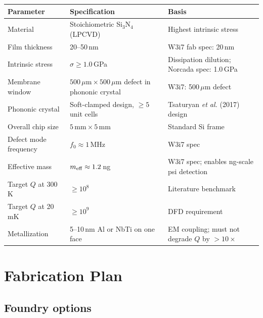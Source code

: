 \documentclass[11pt]{article}
\begin{document}
\begin{center}
\renewcommand{\arraystretch}{1.25}
\begin{tabular}{@{}p{5cm}p{4cm}p{4cm}@{}}
\toprule
\textbf{Parameter} & \textbf{Specification} & \textbf{Basis} \\
\midrule
Material & Stoichiometric Si$_3$N$_4$ (LPCVD) &
  Highest intrinsic stress \\
Film thickness & 20--50\,nm & W3i7 fab spec: 20\,nm \\
Intrinsic stress & $\sigma \geq 1.0$\,GPa &
  Dissipation dilution; Norcada spec: 1.0\,GPa \\
Membrane window & $500\,\mu\text{m} \times 500\,\mu\text{m}$ defect
  in phononic crystal & W3i7: 500\,$\mu$m defect \\
Phononic crystal & Soft-clamped design, $\geq 5$ unit cells &
  Tsaturyan \textit{et al.} (2017) design \\
Overall chip size & $5\,\text{mm} \times 5\,\text{mm}$ &
  Standard Si frame \\
Defect mode frequency & $f_0 \approx 1$\,MHz &
  W3i7 spec \\
Effective mass & $m_{\rm eff} \approx 1.2$\,ng &
  W3i7 spec; enables ng-scale psi detection \\
Target $Q$ at 300\,K & $\geq 10^8$ & Literature benchmark \\
Target $Q$ at 20\,mK & $\geq 10^9$ & DFD requirement \\
Metallization & 5--10\,nm Al or NbTi on one face &
  EM coupling; must not degrade $Q$ by $> 10\times$ \\
\bottomrule
\end{tabular}
\end{center}

\section{Fabrication Plan}

\subsection{Foundry options}
\end{document}
